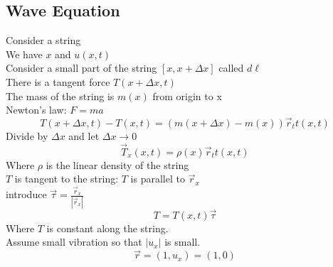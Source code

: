 \documentclass{article}
\begin{document}
\subsection*{Wave Equation}
Consider a string\\
We have $x$ and $u(x,t)$\\
Consider a small part of the string $[x,x+\Delta x]$ called $d\ell$\\
There is a tangent force $T(x + \Delta x,t)$\\
The mass of the string is $m(x)$ from origin to x\\
Newton's law: $F = ma$\\
$$T(x+\Delta x,t) - T(x,t) = (m(x + \Delta x) - m(x)) \vec{r}_tt(x,t)$$
Divide by $\Delta x$ and let $\Delta x \rightarrow 0$\\
$$\vec{T}_x(x,t) = \rho(x) \vec{r}_tt(x,t)$$
Where $\rho$ is the linear density of the string\\
$T$ is tangent to the string: $T$ is parallel to $\vec{r}_x$ \\
introduce $\vec{\tau} = \frac{\vec{r}_x}{| \vec{r}_x |}$\\
$$T = T(x,t) \vec{\tau}$$
Where $T$ is constant along the string.\\
Assume small vibration so that $|u_x|$ is small.\\
$$\vec{r} = (1,u_x) = (1,0) $$
\end{document}
